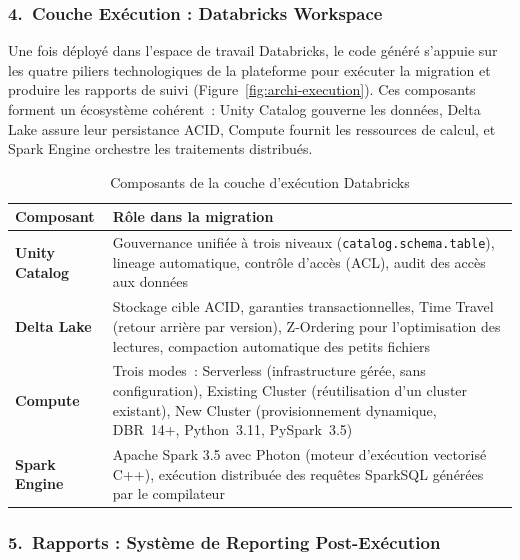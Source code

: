 \subsubsection*{4.\ Couche Exécution : Databricks Workspace}

Une fois déployé dans l'espace de travail Databricks, le code généré s'appuie sur les quatre piliers technologiques de la plateforme pour exécuter la migration et produire les rapports de suivi (Figure~\ref{fig:archi-execution}). Ces composants forment un écosystème cohérent~: Unity Catalog gouverne les données, Delta Lake assure leur persistance ACID, Compute fournit les ressources de calcul, et Spark Engine orchestre les traitements distribués.



\begin{table}[H]
\centering
\caption{Composants de la couche d'exécution Databricks}
\label{tab:execution-layer}
\begin{tabularx}{\textwidth}{lX}
\toprule
\textbf{Composant} & \textbf{Rôle dans la migration} \\
\midrule
\textbf{Unity Catalog} &
  Gouvernance unifiée à trois niveaux (\texttt{catalog.schema.table}), lineage automatique, contrôle d'accès (ACL), audit des accès aux données \\
\addlinespace
\textbf{Delta Lake} &
  Stockage cible ACID, garanties transactionnelles, Time Travel (retour arrière par version), Z-Ordering pour l'optimisation des lectures, compaction automatique des petits fichiers \\
\addlinespace
\textbf{Compute} &
  Trois modes~: Serverless (infrastructure gérée, sans configuration), Existing Cluster (réutilisation d'un cluster existant), New Cluster (provisionnement dynamique, DBR~14+, Python~3.11, PySpark~3.5) \\
\addlinespace
\textbf{Spark Engine} &
  Apache Spark 3.5 avec Photon (moteur d'exécution vectorisé C++), exécution distribuée des requêtes SparkSQL générées par le compilateur \\
\bottomrule
\end{tabularx}
\end{table}

\subsubsection*{5.\ Rapports : Système de Reporting Post-Exécution}


